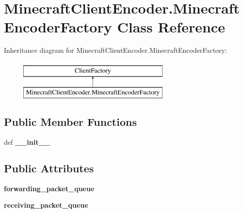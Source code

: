 \hypertarget{classMinecraftClientEncoder_1_1MinecraftEncoderFactory}{\section{Minecraft\-Client\-Encoder.\-Minecraft\-Encoder\-Factory Class Reference}
\label{classMinecraftClientEncoder_1_1MinecraftEncoderFactory}
}
Inheritance diagram for Minecraft\-Client\-Encoder.\-Minecraft\-Encoder\-Factory\-:\begin{figure}[H]
\begin{center}
\leavevmode
\includegraphics[height=2.000000cm]{classMinecraftClientEncoder_1_1MinecraftEncoderFactory}
\end{center}
\end{figure}
\subsection*{Public Member Functions}
\begin{DoxyCompactItemize}
\item 
\hypertarget{classMinecraftClientEncoder_1_1MinecraftEncoderFactory_a60c49451628cb91310196165946f7a68}{def {\bfseries \-\_\-\-\_\-init\-\_\-\-\_\-}}\label{classMinecraftClientEncoder_1_1MinecraftEncoderFactory_a60c49451628cb91310196165946f7a68}

\end{DoxyCompactItemize}
\subsection*{Public Attributes}
\begin{DoxyCompactItemize}
\item 
\hypertarget{classMinecraftClientEncoder_1_1MinecraftEncoderFactory_a3b3ef7e7fc4c0cd649445da12d0a8bb6}{{\bfseries forwarding\-\_\-packet\-\_\-queue}}\label{classMinecraftClientEncoder_1_1MinecraftEncoderFactory_a3b3ef7e7fc4c0cd649445da12d0a8bb6}

\item 
\hypertarget{classMinecraftClientEncoder_1_1MinecraftEncoderFactory_aef65b8ba462d9ea2d51dcf3d9713fd45}{{\bfseries receiving\-\_\-packet\-\_\-queue}}\label{classMinecraftClientEncoder_1_1MinecraftEncoderFactory_aef65b8ba462d9ea2d51dcf3d9713fd45}

\end{DoxyCompactItemize}
